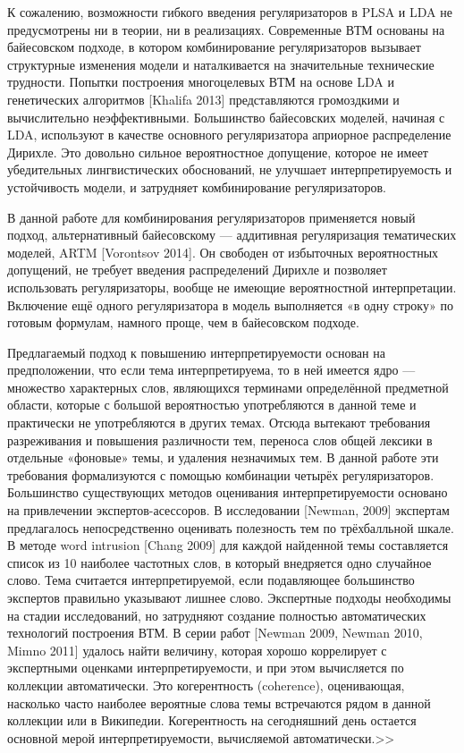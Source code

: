 \documentclass[a4paper,14pt]{extarticle}
\begin{document}
К сожалению, возможности гибкого введения регуляризаторов в PLSA и LDA не
предусмотрены ни в теории, ни в реализациях. Современные ВТМ основаны на
байесовском подходе, в котором комбинирование регуляризаторов вызывает
структурные изменения модели и наталкивается на значительные технические
трудности. Попытки построения многоцелевых ВТМ на основе LDA и генетических
алгоритмов [Khalifa 2013] представляются громоздкими и вычислительно
неэффективными. Большинство байесовских моделей, начиная с LDA, используют
в качестве основного регуляризатора априорное распределение Дирихле.
Это довольно сильное вероятностное допущение, которое не имеет убедительных
лингвистических обоснований, не улучшает интерпретируемость и устойчивость
модели, и затрудняет комбинирование регуляризаторов.

В данной работе для комбинирования регуляризаторов применяется новый
подход, альтернативный байесовскому — аддитивная регуляризация тематических
моделей, ARTM [Vorontsov 2014]. Он свободен от избыточных вероятностных
допущений, не требует введения распределений Дирихле и позволяет использовать
регуляризаторы, вообще не имеющие вероятностной интерпретации. Включение
ещё одного регуляризатора в модель выполняется «в одну строку» по готовым
формулам, намного проще, чем в байесовском подходе.

Предлагаемый подход к повышению интерпретируемости основан на
предположении, что если тема интерпретируема, то в ней имеется ядро —
множество характерных слов, являющихся терминами определённой предметной
области, которые с большой вероятностью употребляются в данной теме и
практически не употребляются в других темах. Отсюда вытекают требования
разреживания и повышения различности тем, переноса слов общей лексики в
отдельные «фоновые» темы, и удаления незначимых тем. В данной работе эти
требования формализуются с помощью комбинации четырёх регуляризаторов.
Большинство существующих методов оценивания интерпретируемости
основано на привлечении экспертов-асессоров. В исследовании [Newman, 2009]
экспертам предлагалось непосредственно оценивать полезность тем по
трёхбалльной шкале. В методе word intrusion [Chang 2009] для каждой найденной
темы составляется список из 10 наиболее частотных слов, в который внедряется
одно случайное слово. Тема считается интерпретируемой, если подавляющее
большинство экспертов правильно указывают лишнее слово. Экспертные подходы
необходимы на стадии исследований, но затрудняют создание полностью 
автоматических технологий построения ВТМ. В серии работ [Newman 2009, Newman
2010, Mimno 2011] удалось найти величину, которая хорошо коррелирует с
экспертными оценками интерпретируемости, и при этом вычисляется по
коллекции автоматически. Это когерентность (coherence), оценивающая,
насколько часто наиболее вероятные слова темы встречаются рядом в данной
коллекции или в Википедии. Когерентность на сегодняшний день остается
основной мерой интерпретируемости, вычисляемой автоматически.>>
\end{document}
